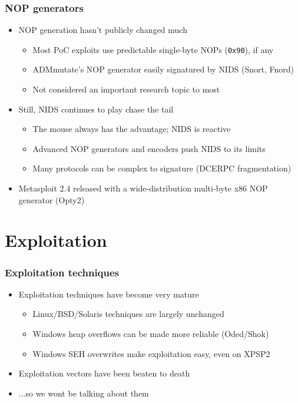\documentclass{beamer}
\newenvironment{sitemize}{\vspace{1mm}\begin{itemize}\itemsep 4pt\small}{\end{itemize}}
\begin{document}
\begin{frame}[t]
    \frametitle{NOP generators}

    \begin{sitemize}
        \item NOP generation hasn't publicly changed much
        \begin{sitemize}
            \item Most PoC exploits use predictable single-byte NOPs (\texttt{0x90}), if any
            \item ADMmutate's NOP generator easily signatured by NIDS (Snort, Fnord)
            \item Not considered an important research topic to most
        \end{sitemize}

        \pause
        \item Still, NIDS continues to play chase the tail
        \begin{sitemize}
            \item The mouse always has the advantage; NIDS is reactive
            \item Advanced NOP generators and encoders push NIDS to its limits
            \item Many protocols can be complex to signature (DCERPC fragmentation)
        \end{sitemize}

        \pause
        \item Metasploit 2.4 released with a wide-distribution
        multi-byte x86 NOP generator (Opty2)
    \end{sitemize}
\end{frame}

\section{Exploitation}
\begin{frame}[t]
    \frametitle{Exploitation techniques}

    \begin{sitemize}
        \item Exploitation techniques have become very mature
        \begin{sitemize}
            \item Linux/BSD/Solaris techniques are largely unchanged
            \item Windows heap overflows can be made more reliable (Oded/Shok)
            \item Windows SEH overwrites make exploitation easy, even on XPSP2
        \end{sitemize}

        \pause
        \item Exploitation vectors have been beaten to death
        \pause
        \item ...so we wont be talking about them
    \end{sitemize}
\end{frame}
\end{document}
